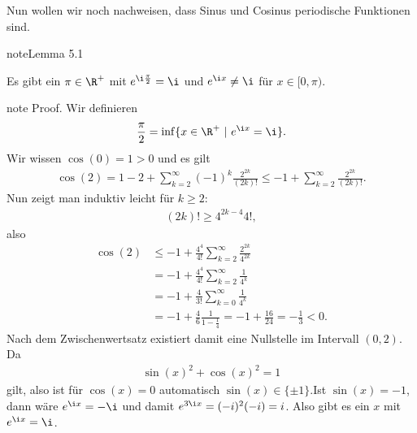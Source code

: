 \documentclass[letterpaper,10pt,english]{jupyterBook}
\begin{document}
Nun wollen wir noch nachweisen, dass Sinus\sphinxhyphen{} und Cosinus periodische Funktionen sind.
\label{stetigkeit/trig:lemma-0}
\begin{sphinxadmonition}{note}{Lemma 5.1}



Es gibt ein \(\pi \in \R^+\) mit \(e^{\i \frac{\pi}2} = \i\) und \(e^{\i x} \neq \i\) für \(x \in [0,\pi)\).
\end{sphinxadmonition}

\begin{sphinxadmonition}{note}
Proof.  Wir definieren
\begin{equation*}
\begin{split} \frac{\pi}2 = \inf\{x \in \R^+~|~e^{\i x } = \i \}.\end{split}
\end{equation*}
Wir wissen \(\cos(0)=1 > 0\) und es gilt
\begin{equation*}
\begin{split} \cos(2)= 1 -2 + \sum_{k=2}^\infty (-1)^k \frac{2^{2k}}{(2k)!} \leq -1 + \sum_{k=2}^\infty  \frac{2^{2k}}{(2k)!} .\end{split}
\end{equation*}
Nun zeigt man induktiv leicht für \(k \geq 2\):
\begin{equation*}
\begin{split} (2k)! \geq 4^{2k-4} 4! ,\end{split}
\end{equation*}
also
\begin{align*}
\cos(2) &\leq -1 + \frac{4^4}{4!} \sum_{k=2}^\infty \frac{2^{2k}}{4^{2k}} \\
&= -1   + \frac{4^4}{4!} \sum_{k=2}^\infty \frac{1}{4^{k}} \\
&= -1   + \frac{4 }{3!} \sum_{k=0}^\infty \frac{1}{4^{k}} \\
&= -1 + \frac{4}{6} \frac{1}{1-\frac{1}4} = -1 + \frac{16}{24}  = - \frac{1}{3} < 0.
\end{align*}
Nach dem Zwischenwertsatz existiert damit eine Nullstelle im Intervall \((0,2)\). Da
\begin{equation*}
\begin{split} \sin(x)^2 + \cos(x)^2 = 1\end{split}
\end{equation*}
gilt, also ist für \(\cos(x) = 0\) automatisch \(\sin(x) \in \{\pm 1\}\).Ist \(\sin(x) = -1\), dann wäre \(e^{\i x} = -\i\) und damit \(e^{3\i x} = (-i)^2(-i) = i\). Also gibt es ein \(x\) mit \(e^{\i x} =\i\).
\end{sphinxadmonition}
\end{document}
